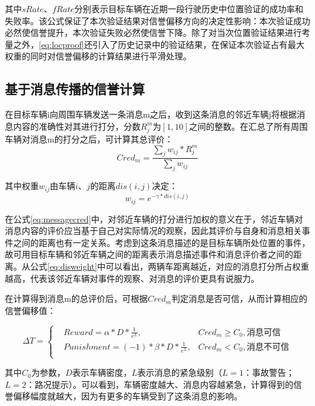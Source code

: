 其中$sRate$、$fRate$分别表示目标车辆在近期一段行驶历史中位置验证的成功率和失败率。该公式保证了本次验证结果对信誉偏移方向的决定性影响：本次验证成功必然使信誉提升，本次验证失败必然使信誉下降。除了对当次位置验证结果进行考量之外，\eqref{eq:locproof}还引入了历史记录中的验证结果，在保证本次验证占有最大权重的同时对信誉偏移的计算结果进行平滑处理。

\subsection{基于消息传播的信誉计算}
在目标车辆i向周围车辆发送一条消息m之后，收到这条消息的邻近车辆j将根据消息内容的准确性对其进行打分，分数$R_j^m$为$[1,10]$之间的整数。在汇总了所有周围车辆对消息m的打分之后，可计算其总评价：
\begin{equation}
    Cred_m=\frac{\sum_jw_{ij}*R_j^m}{\sum_jw_{ij}}
    \label{eq:messagecred}
\end{equation}

其中权重$w_{ij}$由车辆$i$、$j$的距离$dis(i,j)$决定：
\begin{equation}
    w_{ij}=e^{-\gamma* dis(i,j)}
    \label{eq:disweight}
\end{equation}

在公式\eqref{eq:messagecred}中，对邻近车辆的打分进行加权的意义在于，邻近车辆对消息内容的评价应当基于自己对实际情况的观察，因此其评价与自身和消息相关事件之间的距离也有一定关系。考虑到这条消息描述的是目标车辆所处位置的事件，故可用目标车辆和邻近车辆之间的距离表示消息描述事件和消息评价者之间的距离。从公式\eqref{eq:disweight}中可以看出，两辆车距离越近，对应的消息打分所占权重越高，代表该邻近车辆对事件的观察、对消息的评价更具有说服力。

在计算得到消息m的总评价后，可根据$Cred_m$判定消息是否可信，从而计算相应的信誉偏移值：

\begin{equation}
    \Delta T=\left\{\begin{aligned}
    &Reward=\alpha*D*\frac{1}{e^L}, &{Cred_m\geq C_0,\mbox{消息可信}}\\
    &Punishment=(-1)*\beta*D*\frac{1}{e^L}, & {Cred_m<C_0,\mbox{消息不可信}}\\
    \end{aligned} \right.
    \label{eq:message}
\end{equation}

其中$C_0$为参数，$D$表示车辆密度，$L$表示消息的紧急级别（$L=1$：事故警告；$L=2$：路况提示）。可以看到，车辆密度越大、消息内容越紧急，计算得到的信誉偏移幅度就越大，因为有更多的车辆受到了这条消息的影响。

